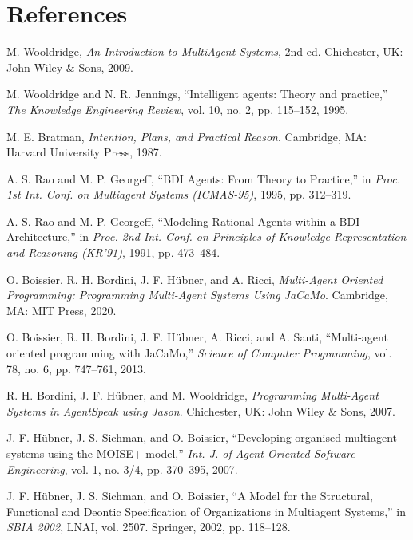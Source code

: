 \documentclass[11pt,a4paper]{article}
\begin{document}
\section*{References}
{\small
\begin{list}{}{\setlength{\leftmargin}{2.0em}\setlength{\itemindent}{-2.0em}\setlength{\itemsep}{3pt}}

\item [1] M. Wooldridge, \emph{An Introduction to MultiAgent Systems}, 2nd ed. Chichester, UK: John Wiley \& Sons, 2009.
\item [2] M. Wooldridge and N. R. Jennings, ``Intelligent agents: Theory and practice,'' \emph{The Knowledge Engineering Review}, vol. 10, no. 2, pp. 115--152, 1995.
\item [3] M. E. Bratman, \emph{Intention, Plans, and Practical Reason}. Cambridge, MA: Harvard University Press, 1987.
\item [4] A. S. Rao and M. P. Georgeff, ``BDI Agents: From Theory to Practice,'' in \emph{Proc. 1st Int. Conf. on Multiagent Systems (ICMAS-95)}, 1995, pp. 312--319.
\item [5] A. S. Rao and M. P. Georgeff, ``Modeling Rational Agents within a BDI-Architecture,'' in \emph{Proc. 2nd Int. Conf. on Principles of Knowledge Representation and Reasoning (KR'91)}, 1991, pp. 473--484.
\item [6] O. Boissier, R. H. Bordini, J. F. Hübner, and A. Ricci, \emph{Multi-Agent Oriented Programming: Programming Multi-Agent Systems Using JaCaMo}. Cambridge, MA: MIT Press, 2020.
\item [7] O. Boissier, R. H. Bordini, J. F. Hübner, A. Ricci, and A. Santi, ``Multi-agent oriented programming with JaCaMo,'' \emph{Science of Computer Programming}, vol. 78, no. 6, pp. 747--761, 2013.
\item [8] R. H. Bordini, J. F. Hübner, and M. Wooldridge, \emph{Programming Multi-Agent Systems in AgentSpeak using Jason}. Chichester, UK: John Wiley \& Sons, 2007.
\item [9] J. F. Hübner, J. S. Sichman, and O. Boissier, ``Developing organised multiagent systems using the MOISE+ model,'' \emph{Int. J. of Agent-Oriented Software Engineering}, vol. 1, no. 3/4, pp. 370--395, 2007.
\item [10] J. F. Hübner, J. S. Sichman, and O. Boissier, ``A Model for the Structural, Functional and Deontic Specification of Organizations in Multiagent Systems,'' in \emph{SBIA 2002}, LNAI, vol. 2507. Springer, 2002, pp. 118--128.

\end{list}}
\end{document}
